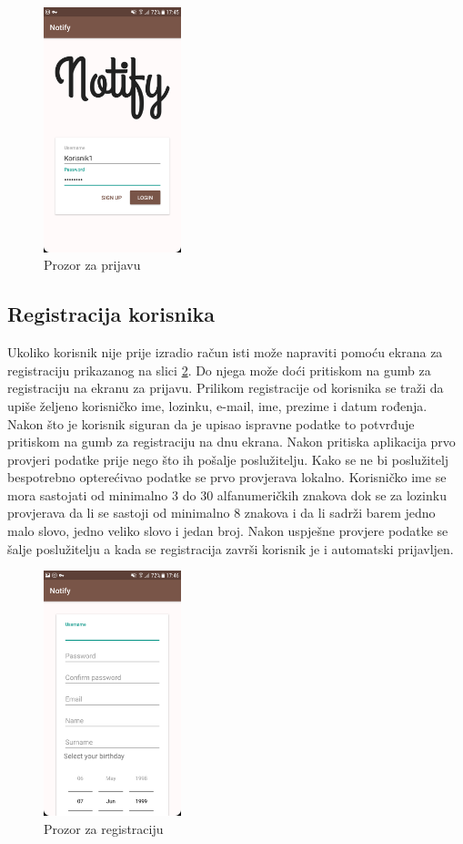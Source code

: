 \documentclass[times, utf8, zavrsni]{fer}
\begin{document}
\begin{figure}[htb]
\centering
\includegraphics[width=4cm]{img/ss-login.png}
\caption{Prozor za prijavu}
\label{fig:login-image}
\end{figure}

\subsection{Registracija korisnika}
Ukoliko korisnik nije prije izradio račun isti može napraviti pomoću ekrana za registraciju prikazanog na slici \ref{fig:register-image}. Do njega može doći pritiskom na gumb za registraciju  na ekranu za prijavu. Prilikom registracije od korisnika se traži da upiše željeno korisničko ime, lozinku, e-mail, ime, prezime i datum rođenja. Nakon što je korisnik siguran da je upisao ispravne podatke to potvrđuje pritiskom na gumb za registraciju na dnu ekrana. Nakon pritiska aplikacija prvo provjeri podatke prije nego što ih pošalje poslužitelju. Kako se ne bi poslužitelj bespotrebno opterećivao podatke se prvo provjerava lokalno. Korisničko ime se mora sastojati od minimalno 3 do 30 alfanumeričkih znakova dok se za lozinku provjerava da li se sastoji od minimalno 8 znakova i da li sadrži barem jedno malo slovo, jedno veliko slovo i jedan broj. Nakon uspješne provjere podatke se šalje poslužitelju a kada se registracija završi korisnik je i automatski prijavljen.

\begin{figure}[htb]
\centering
\includegraphics[width=4cm]{img/ss-register.png}
\caption{Prozor za registraciju}
\label{fig:register-image}
\end{figure}
\end{document}
